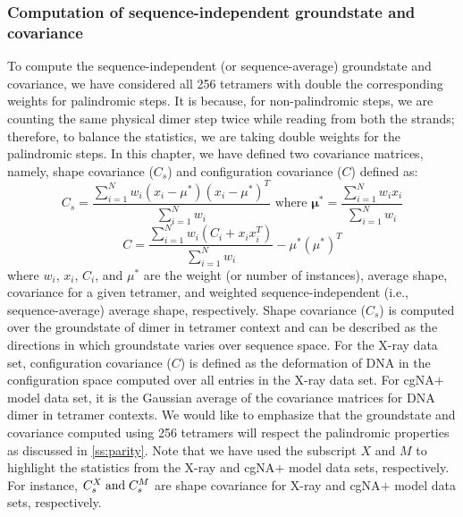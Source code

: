 \subsubsection{Computation of sequence-independent groundstate and covariance}\label{ss:avg_cov}
To compute the sequence-independent (or sequence-average) groundstate and covariance, we have considered all 256 tetramers with double the corresponding weights for palindromic steps.
It is because, for non-palindromic steps, we are counting the same physical dimer step twice while reading from both the strands; therefore, to balance the statistics, we are taking double weights for the palindromic steps. 
In this chapter, we have defined two covariance matrices, namely, shape covariance ($C_s$) and configuration covariance ($C$) defined as: 
\begin{equation}
C_s=\frac{\sum_{i=1}^N w_i \left(x_i - \mu^*\right)\left(x_i - \mu^*\right)^T}{\sum_{i=1}^{N}w_i}
\text{ where } \mathbf{\mu^*}=\frac{\sum_{i=1}^N w_i x_i}{\sum_{i=1}^N w_i}
\end{equation}
\begin{equation}
C=\frac{\sum_{i=1}^N w_i \left(C_i + x_ix_i^T  \right)}{\sum_{i=1}^{N}w_i} - \mu^*(\mu^*)^T
\end{equation}
where $w_i$, $x_i$, $C_i$, and $\mu^*$ are the weight (or number of instances), average shape, covariance for a given tetramer, and weighted sequence-independent (i.e., sequence-average) average shape, respectively.
Shape covariance ($C_s$) is computed over the groundstate of dimer in tetramer context and
can be described as the directions in which groundstate varies over sequence space. 
For the X-ray data set, configuration covariance ($C$) is defined as the deformation of DNA in the configuration space computed over all entries in the X-ray data set. 
For cgNA$+$ model data set, it is the Gaussian average of the covariance matrices for DNA dimer in tetramer contexts.
We would like to emphasize that the groundstate and covariance computed using 256 tetramers will respect the palindromic properties as discussed in \cref{ss:parity}.  
Note that we have used the subscript $X$ and $M$ to highlight the statistics from the X-ray and cgNA$+$ model data sets, respectively. 
For instance, $C_s^X {\;\text{and\;}} C_s^M$ are shape covariance for  X-ray and cgNA$+$ model data sets, respectively.


